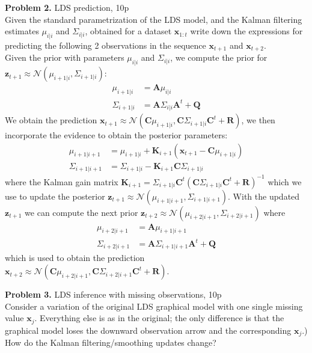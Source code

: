 \documentclass[12pt]{article}
\newcommand{\matr}[1]{\bm{#1}}     %
\newcommand{\vect}[1]{\mathbf{#1}}
\begin{document}
\noindent \textbf{Problem 2. } LDS prediction, 10p \\%
Given the standard parametrization of the LDS model, and the Kalman filtering estimates $\mu_{i|i}$ and $\Sigma_{i|i}$, obtained for a dataset $\vect{x}_{1:t}$ write down the expressions 
for predicting the following 2 observations in the sequence $\vect{x}_{t+1}$ and  $\vect{x}_{t+2}$.\\
Given the prior with parameters  $\mu_{i|i}$ and $\Sigma_{i|i}$, we compute the prior for $\vect{z}_{t + 1} \approx \mathcal{N} (\mu_{i+1|i}, \Sigma_{i+1|i})$:
\begin{align*}
	\mu_{i+1|i}	&= 	\matr{A} \mu_{i|i} \\
	\Sigma_{i+1|i}	&=	 \matr{A}  \Sigma_{i|i}  \matr{A}^t + \matr{Q}
\end{align*}
We obtain the prediction $\vect{x}_{t+1} \approx \mathcal{N} (\matr{C} \mu_{i+1|i}, \matr{C} \Sigma_{i+1|i} \matr{C}^t + \matr{R} )$, we then incorporate the evidence to obtain the posterior parameters:
\begin{align*}
	\mu_{i+1|i+1}		&= 	\mu_{i+1|i} + \matr{K}_{i+1} (\vect{x}_{t+1} - \matr{C} \mu_{i+1|i}) \\
	\Sigma_{i+1|i+1}	&=	\Sigma_{i+1|i} - \matr{K}_{i+1} 	 \matr{C}  \Sigma_{i+1|i}
\end{align*}
where the Kalman gain matrix $ \matr{K}_{i+1} = \Sigma_{i+1|i}	 \matr{C} ^t ( \matr{C} \Sigma_{i+1|i}  \matr{C} ^t + \matr{R})^{-1}$
which we use to update the posterior $\vect{z}_{t+1} \approx \mathcal{N} (\mu_{i+1|i+1},\Sigma_{i+1|i+1})$.
With the updated  $\vect{z}_{t+1}$ we can compute the next prior $\vect{z}_{t + 2} \approx \mathcal{N} (\mu_{i+2|i+1}, \Sigma_{i+2|i+1})$ where 
\begin{align*}
	\mu_{i+2|i+1}		&= 	\matr{A} \mu_{i+1|i+1} \\
	\Sigma_{i+2|i+1}	&=	 \matr{A}  \Sigma_{i+1|i+1}  \matr{A}^t + \matr{Q}
\end{align*}
which is used to obtain the prediction  $\vect{x}_{t+2} \approx \mathcal{N} (\matr{C} \mu_{i+2|i+1}, \matr{C} \Sigma_{i+2|i+1} \matr{C}^t + \matr{R} )$.
 
\noindent \textbf{Problem 3.} LDS inference with missing observations, 10p \\
Consider a variation of the original LDS graphical model with one single missing value $\mathbf{x}_j$. Everything else is as in the original; the only difference is that the graphical model loses the downward observation arrow and the corresponding $\mathbf{x}_j$.)
How do the Kalman filtering/smoothing updates change?\\
\end{document}
